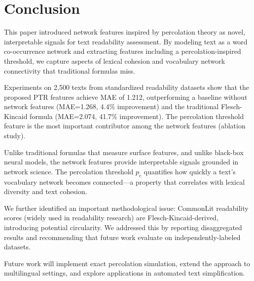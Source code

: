 \documentclass[11pt,letterpaper]{article}
\begin{document}
\section{Conclusion}

This paper introduced network features inspired by percolation theory as novel, interpretable signals for text readability assessment. By modeling text as a word co-occurrence network and extracting features including a percolation-inspired threshold, we capture aspects of lexical cohesion and vocabulary network connectivity that traditional formulas miss.

Experiments on 2,500 texts from standardized readability datasets show that the proposed PTR features achieve MAE of 1.212, outperforming a baseline without network features (MAE=1.268, 4.4\% improvement) and the traditional Flesch-Kincaid formula (MAE=2.074, 41.7\% improvement). The percolation threshold feature is the most important contributor among the network features (ablation study).

Unlike traditional formulas that measure surface features, and unlike black-box neural models, the network features provide interpretable signals grounded in network science. The percolation threshold $p_c$ quantifies how quickly a text's vocabulary network becomes connected---a property that correlates with lexical diversity and text cohesion.

We further identified an important methodological issue: CommonLit readability scores (widely used in readability research) are Flesch-Kincaid-derived, introducing potential circularity. We addressed this by reporting disaggregated results and recommending that future work evaluate on independently-labeled datasets.

Future work will implement exact percolation simulation, extend the approach to multilingual settings, and explore applications in automated text simplification.



\end{document}
